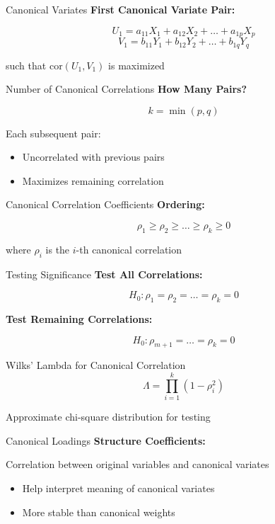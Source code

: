 \documentclass[aspectratio=169,ignorenonframetext]{beamer}
\begin{document}
\begin{frame}{Canonical Variates}
\textbf{First Canonical Variate Pair:}

\[U_{1} = a_{11}X_{1} + a_{12}X_{2} + \ldots + a_{1p}X_{p}\]
\[V_{1} = b_{11}Y_{1} + b_{12}Y_{2} + \ldots + b_{1q}Y_{q}\]

such that \(\text{cor}\left( U_{1},V_{1} \right)\) is maximized
\end{frame}

\begin{frame}{Number of Canonical Correlations}
\textbf{How Many Pairs?}

\[k = \min(p,q)\]

Each subsequent pair:

\begin{itemize}
\item
  Uncorrelated with previous pairs
\item
  Maximizes remaining correlation
\end{itemize}
\end{frame}

\begin{frame}{Canonical Correlation Coefficients}
\textbf{Ordering:}

\[\rho_{1} \geq \rho_{2} \geq \ldots \geq \rho_{k} \geq 0\]

where \(\rho_{i}\) is the \(i\)-th canonical correlation
\end{frame}

\begin{frame}{Testing Significance}
\textbf{Test All Correlations:}

\[H_{0}:\rho_{1} = \rho_{2} = \ldots = \rho_{k} = 0\]

\textbf{Test Remaining Correlations:}

\[H_{0}:\rho_{m + 1} = \ldots = \rho_{k} = 0\]
\end{frame}

\begin{frame}{Wilks' Lambda for Canonical Correlation}
\[\Lambda = \prod_{i = 1}^{k}\left( 1 - \rho_{i}^{2} \right)\]

Approximate chi-square distribution for testing
\end{frame}

\begin{frame}{Canonical Loadings}
\textbf{Structure Coefficients:}

Correlation between original variables and canonical variates

\begin{itemize}
\item
  Help interpret meaning of canonical variates
\item
  More stable than canonical weights
\end{itemize}
\end{frame}
\end{document}
